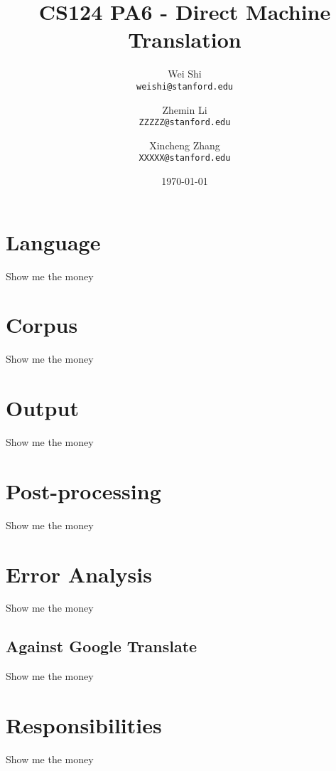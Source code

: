 \documentclass[11pt]{article} %
\author{
    Wei Shi\\
    \texttt{weishi@stanford.edu}
    \and
    Zhemin Li\\
    \texttt{ZZZZZ@stanford.edu}
    \and
    Xincheng Zhang\\
    \texttt{XXXXX@stanford.edu}
}
\begin{document}
\title{CS124 PA6 - Direct Machine Translation}
\date{\today}
\maketitle

\section{Language}
Show me the money

\section{Corpus}
Show me the money

\section{Output}
Show me the money

\section{Post-processing}
Show me the money

\section{Error Analysis}
Show me the money

\subsection{Against Google Translate}
Show me the money

\section{Responsibilities}
Show me the money
\end{document}
